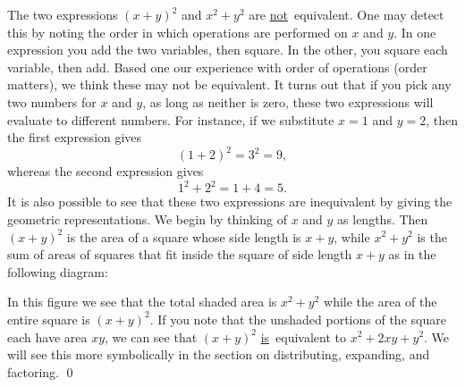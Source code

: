 \par

\begin{eg}
The two expressions $(x+y)^2$ and $x^2 + y^2$ are \underline{not}\normalfont\ equivalent. One may detect this by noting the order in which operations are performed on $x$ and $y$. In one expression you add the two variables, then square. In the other, you square each variable, then add. Based one our experience with order of operations (order matters), we think these may not be equivalent. It turns out that if you pick any two numbers for $x$ and $y$, as long as neither is zero, these two expressions will evaluate to different numbers. For instance, if we substitute $x=1$ and $y=2$, then the first expression gives 
\[
(1+2)^2 = 3^2 =9,
\]
whereas the second expression gives
\[
1^2+2^2 = 1+4 = 5.
\]
It is also possible to see that these two expressions are inequivalent by giving the geometric representations. We begin by thinking of $x$ and $y$ as lengths. Then $(x+y)^2$ is the area of a square whose side length is $x+y$, while $x^2+y^2$ is the sum of areas of squares that fit inside the square of side length $x+y$ as in the following diagram:

\vspace{.2in}
\begin{figure}[h]
\centering
{}
\end{figure}



In this figure we see that the total shaded area is $x^2+y^2$ while the area of the entire square is $(x+y)^2$. If you note that the unshaded portions of the square each have area $xy$, we can see that $(x+y)^2$ \underline{is}\normalfont\ equivalent to $x^2+2xy+y^2$. We will see this more symbolically in the section on distributing, expanding, and factoring. \qed
\end{eg}

\par

